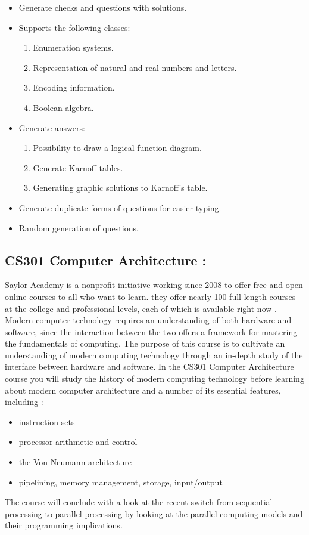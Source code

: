 \begin{itemize}
	\item Generate checks and questions with solutions.
	\item Supports the following classes:
	\begin{enumerate}
		\item Enumeration systems.
		\item Representation of natural and real numbers and letters.
		\item Encoding information.
		\item Boolean algebra.
	\end{enumerate}
	\item Generate answers:
	\begin{enumerate}
		\item Possibility to draw a logical function diagram.
		\item Generate Karnoff tables.
		\item Generating graphic solutions to Karnoff's table.
	\end{enumerate}
	\item Generate duplicate forms of questions for easier typing.
	\item Random generation of questions.
\end{itemize}

 

 \subsection{CS301 Computer Architecture :}
 Saylor Academy is a nonprofit initiative working since 2008 to offer free and open online courses to all who want to learn.
  they offer nearly 100 full-length courses at the college and professional levels, each of which is available right now .
 Modern computer technology requires an understanding of both hardware and software, since the interaction between the two 
 offers a framework for mastering the fundamentals of computing. The purpose of this course is to cultivate an understanding 
 of modern computing technology through an in-depth study of the interface between hardware and software. In the CS301 Computer Architecture course
  you will study the history of modern computing technology before learning about modern computer architecture and a number
   of its essential features, including :
 \begin{itemize}
	 \item instruction sets
	 \item processor arithmetic and control
	 \item the Von Neumann architecture
	 \item pipelining, memory management, storage, input/output
 \end{itemize}  
 The course will conclude with a look at the recent switch from sequential processing to parallel processing by looking at the parallel
  computing models and their programming implications.\cite{Computer-Architecture-saylor-academy}
 
